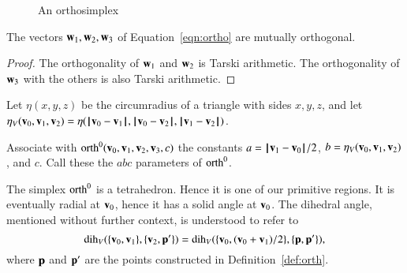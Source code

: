 
\begin{figure}[htb]
  \centering
  \caption{An orthosimplex}
\end{figure}


\begin{lemma} The vectors $\w_1,\w_2,\w_3$ of Equation~\ref{eqn:ortho}
are mutually orthogonal.
%
\end{lemma}

\begin{proof} The orthogonality of $\w_1$ and $\w_2$ is 
Tarski arithmetic. %
The orthogonality of $\w_3$ with the others is also Tarski arithmetic. %
\end{proof}
%

\begin{definition}\label{def:etaV}
Let $\eta(x,y,z)$ be the circumradius of a triangle with sides
$x,y,z$, and let $\eta_V(\v_0,\v_1,\v_2) = \eta(\norm{\v_0}{\v_1},\norm{\v_0}{\v_2},\norm{\v_1}{\v_2})$.
%
%
%
\end{definition}

\begin{definition}
Associate with $\op{orth}^0(\v_0,\v_1,\v_2,\v_3,c)$ the constants
$a=\norm{\v_1}{\v_0}/2$, $b=\eta_V(\v_0,\v_1,\v_2)$, and $c$.
Call these the $abc$ parameters of $\op{orth}^0$.
%
%
%
\end{definition}

The simplex $\op{orth}^0$ is a tetrahedron.  Hence it is one of our
primitive regions.  It is eventually radial at $\v_0$, hence
it has a solid angle at $\v_0$.  The dihedral
angle, mentioned without further context, is understood to refer to 
   \begin{displaymath}
   \dih_V(\{\v_0,\v_1\},\{\v_2,\p'\})=\dih_V(\{\v_0,(\v_0+\v_1)/2\},\{\p,\p'\}),
   \end{displaymath}
%
where $\p$ and $\p'$ are the points 
constructed in Definition~\ref{def:orth}.

